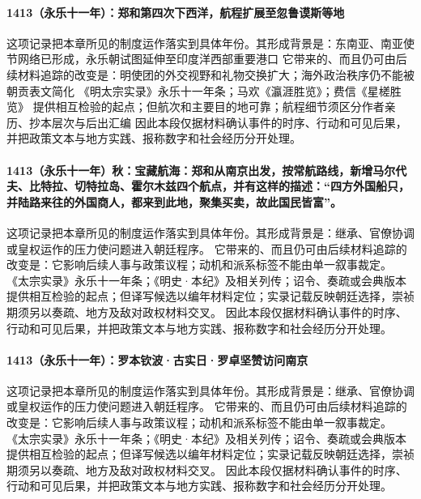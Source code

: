 \paragraph{1413（永乐十一年）：郑和第四次下西洋，航程扩展至忽鲁谟斯等地} 这项记录把本章所见的制度运作落实到具体年份。其形成背景是：东南亚、南亚使节网络已形成，永乐朝试图延伸至印度洋西部重要港口 它带来的、而且仍可由后续材料追踪的改变是：明使团的外交视野和礼物交换扩大；海外政治秩序仍不能被朝贡表文简化 《明太宗实录》永乐十一年条；马欢《瀛涯胜览》；费信《星槎胜览》 提供相互检验的起点；但航次和主要目的地可靠；航程细节须区分作者亲历、抄本层次与后出汇编 因此本段仅据材料确认事件的时序、行动和可见后果，并把政策文本与地方实践、报称数字和社会经历分开处理。

\paragraph{1413（永乐十一年）秋：宝藏航海：郑和从南京出发，按常航路线，新增马尔代夫、比特拉、切特拉岛、霍尔木兹四个航点，并有这样的描述：“四方外国船只，并陆路来往的外国商人，都来到此地，聚集买卖，故此国民皆富”。} 这项记录把本章所见的制度运作落实到具体年份。其形成背景是：继承、官僚协调或皇权运作的压力使问题进入朝廷程序。 它带来的、而且仍可由后续材料追踪的改变是：它影响后续人事与政策议程；动机和派系标签不能由单一叙事裁定。 《太宗实录》永乐十一年条；《明史·本纪》及相关列传；诏令、奏疏或会典版本 提供相互检验的起点；但译写候选以编年材料定位；实录记载反映朝廷选择，崇祯期须另以奏疏、地方及敌对政权材料交叉。 因此本段仅据材料确认事件的时序、行动和可见后果，并把政策文本与地方实践、报称数字和社会经历分开处理。

\paragraph{1413（永乐十一年）：罗本钦波·古实日·罗卓坚赞访问南京} 这项记录把本章所见的制度运作落实到具体年份。其形成背景是：继承、官僚协调或皇权运作的压力使问题进入朝廷程序。 它带来的、而且仍可由后续材料追踪的改变是：它影响后续人事与政策议程；动机和派系标签不能由单一叙事裁定。 《太宗实录》永乐十一年条；《明史·本纪》及相关列传；诏令、奏疏或会典版本 提供相互检验的起点；但译写候选以编年材料定位；实录记载反映朝廷选择，崇祯期须另以奏疏、地方及敌对政权材料交叉。 因此本段仅据材料确认事件的时序、行动和可见后果，并把政策文本与地方实践、报称数字和社会经历分开处理。

